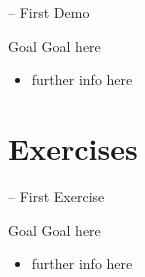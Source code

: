 \documentclass[presentation]{beamer}\mode<presentation>{\usetheme{AMSBolognaFC}}
\begin{document}
\startDemo

\begin{frame}{\currentDemo{} -- First Demo}
	\begin{block}{Goal}
		Goal here
	\end{block}
	\begin{itemize}
		\item further info here
	\end{itemize}
\end{frame}

\section{Exercises}

\startExercise

\begin{frame}{\currentExercise{} -- First Exercise}
	\begin{block}{Goal}
		Goal here
	\end{block}
	\begin{itemize}
		\item further info here
	\end{itemize}
\end{frame}

\section*{}

\frame{\titlepage}

\section*{\refname}

\begin{frame}[c,noframenumbering]{\refname}
	\scriptsize
	
	
\end{frame}

\end{document}
